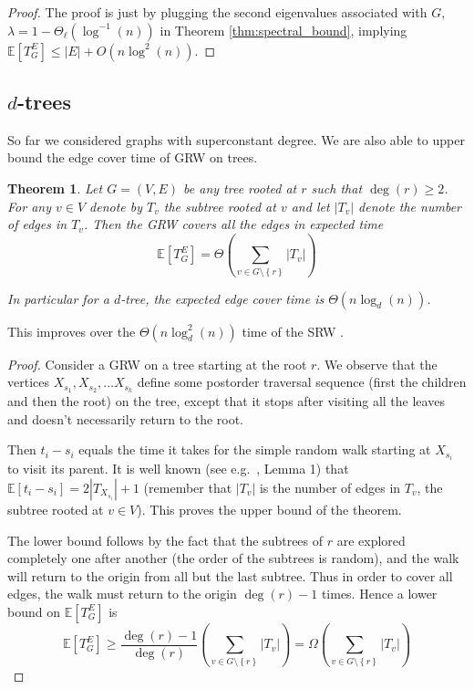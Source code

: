 \documentclass[12pt,a4paper]{article}
\newcommand{\set}[1]{{\left\{#1 \right\}}}
\newcommand{\0}{{\bf 0}}
\newcommand{\E}{{\mathbb E}}
\newtheorem{theorem}{Theorem}[section]
\begin{document}
    \begin{proof}
        The proof is just by plugging the second eigenvalues associated with $G$, $\lambda = 1 - \Theta_\ell(\log^{-1}(n))$ in Theorem \ref{thm:spectral_bound},
        implying $\E[T^E_G] \leq |E| + O ( n \log^2(n) )$.
    \end{proof}

\subsection{$d$-trees}\label{subsec:binary_tree}

    So far we considered graphs with superconstant degree.
    We are also able to upper bound the edge cover time of GRW on trees.

    \begin{theorem}\label{thm:trees}
        Let $G = (V,E)$ be any tree rooted at $r$ such that $\deg(r) \geq 2$.
        For any $v \in V$ denote by $T_v$ the subtree rooted at $v$
        and let $|T_v|$ denote the number of edges in $T_v$.
        Then the GRW covers all the edges in expected time
        \[
            \E[T^E_G] = \Theta \left( \sum_{v \in G \setminus \set{r}} |T_v| \right)
        \]

        In particular for a $d$-tree, the expected edge cover time is $\Theta(n \log_d(n))$.
    \end{theorem}
    This improves over the $\Theta (n \log^2_d(n) )$ time of the SRW \cite{aldous1991random}.
    \begin{proof}
        Consider a GRW on a tree starting at the root $r$.
        We observe that the vertices $X_{s_1},X_{s_2},\dots X_{s_k}$ define some postorder traversal sequence (first the children and then the root)
        on the tree, except that it stops after visiting all the leaves and doesn't necessarily return to the root.

        Then $t_i - s_i$ equals the time it takes for the simple random walk starting at $X_{s_i}$ to visit its parent.
        It is well known (see e.g.\ \cite{AKLLR79}, Lemma 1) that $\E[t_i - s_i] = 2|T_{X_{s_i}}| + 1$ (remember that
        $|T_v|$ is the number of edges in $T_v$, the subtree rooted at $v \in V$).
        This proves the upper bound of the theorem.

        The lower bound follows by the fact that the subtrees of $r$
        are explored completely one after another (the order of the subtrees is random),
        and the walk will return to the origin from all but the last subtree.
        Thus in order to cover all edges, the walk must return to the origin $\deg(r) - 1$ times.
        Hence a lower bound on $\E[T^E_G]$ is
        \[
            \E[T^E_G] \geq \frac{\deg(r)-1}{\deg(r)} \left( \sum_{v \in G \setminus \set{r}} |T_v| \right)
                = \Omega \left( \sum_{v \in G \setminus \set{r}} |T_v| \right)
        \]
    \end{proof}
\end{document}
